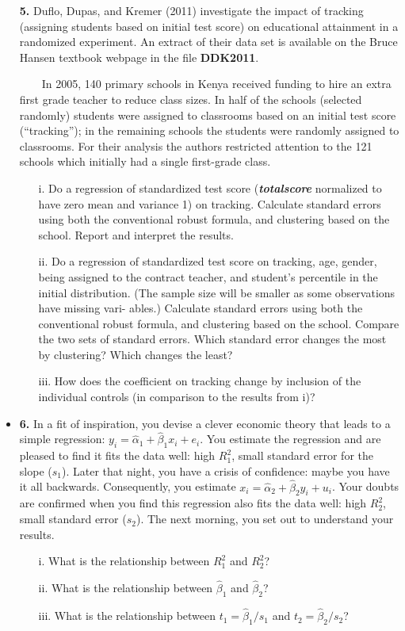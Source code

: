 \documentclass[a4paper]{ctexart}
\theoremstyle{remark}
\begin{document}
\begin{itemize}
\item[\textbf{5.}]  Duflo, Dupas, and Kremer (2011) investigate the impact of tracking (assigning students based on initial test score) on educational attainment in a randomized experiment. An extract of their data set is available on the Bruce Hansen textbook webpage in the file \textbf{DDK2011}.

~~~~In 2005, 140 primary schools in Kenya received funding to hire an extra first grade teacher to reduce class sizes. In half of the schools (selected randomly) students were assigned to classrooms based on an initial test score (``tracking''); in the remaining schools the students were randomly assigned to classrooms. For their analysis the authors restricted attention to the 121 schools which initially had a single first-grade class.
\begin{enumerate}
\item[i.] Do a regression of standardized test score (\textit{\textbf{totalscore}} normalized to have zero mean and variance 1) on tracking. Calculate standard errors using both the conventional robust formula, and clustering based on the school. Report and interpret the results.
\item[ii.]  Do a regression of standardized test score on tracking, age, gender, being assigned to the contract teacher, and student's percentile in the initial distribution. (The sample size will be smaller as some observations have missing vari- ables.) Calculate standard errors using both the conventional robust formula, and clustering based on the school. Compare the two sets of standard errors. Which standard error changes the most by clustering? Which changes the least?

\item[iii.]  How does the coefficient on tracking change by inclusion of the individual controls (in comparison to the results from i)?
\end{enumerate}



\iffalse
\item \textbf{6.}
In a fit of inspiration, you devise a clever economic theory that leads to a simple regression: $y_i = \hat\alpha_1 + \hat\beta_1x_i + e_i$. You estimate the regression and are pleased to find it fits the data well: high $R_1^2$, small standard error for the slope ($s_1$). Later that night, you have a crisis of confidence: maybe you have it all backwards. Consequently, you estimate $x_i = \hat\alpha_2 + \hat\beta_2y_i+ u_i$. Your doubts are confirmed when you find this regression also fits the data well: high $R_2^2$, small standard error ($s_2$). The next morning, you set out to understand your results.
\begin{enumerate}
\item[i.] What is the relationship between $R_1^2$ and $R_2^2$?
\item[ii.]  What is the relationship between $\hat\beta_1$ and $\hat\beta_2$?
\item[iii.]  What is the relationship between $t_1 = \hat\beta_1/s_1$ and $t_2 = \hat\beta_2/s_2$?
\end{enumerate}


\end{itemize}
\end{document}

